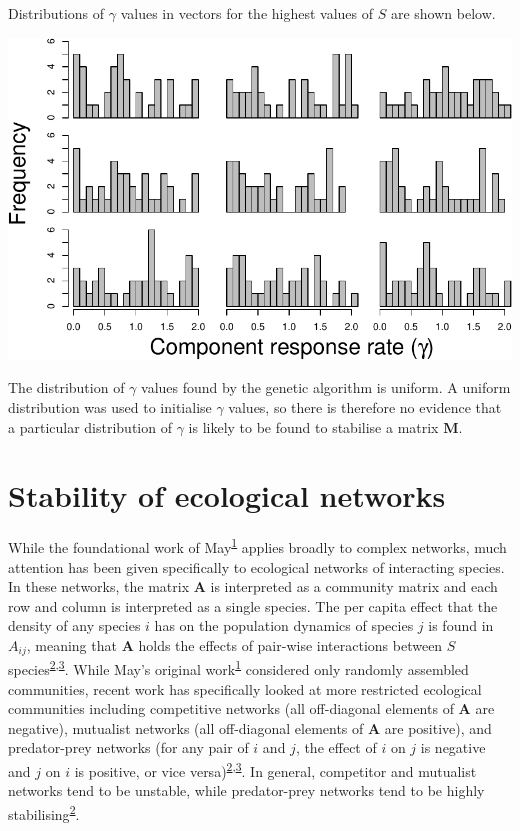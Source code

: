 \documentclass[]{article}
\begin{document}
Distributions of \(\gamma\) values in vectors for the highest values of
\(S\) are shown below.

\includegraphics{SI_files/figure-latex/unnamed-chunk-7-1.pdf}

The distribution of \(\gamma\) values found by the genetic algorithm is
uniform. A uniform distribution was used to initialise \(\gamma\)
values, so there is therefore no evidence that a particular distribution
of \(\gamma\) is likely to be found to stabilise a matrix
\(\mathbf{M}\).

\hypertarget{ecological}{\section{Stability of ecological
networks}\label{ecological}}

While the foundational work of
May\textsuperscript{\protect\hyperlink{ref-May1972}{1}} applies broadly
to complex networks, much attention has been given specifically to
ecological networks of interacting species. In these networks, the
matrix \(\mathbf{A}\) is interpreted as a community matrix and each row
and column is interpreted as a single species. The per capita effect
that the density of any species \(i\) has on the population dynamics of
species \(j\) is found in \(A_{ij}\), meaning that \(\mathbf{A}\) holds
the effects of pair-wise interactions between \(S\)
species\textsuperscript{\protect\hyperlink{ref-Allesina2012}{2},\protect\hyperlink{ref-Allesina2015}{3}}.
While May's original
work\textsuperscript{\protect\hyperlink{ref-May1972}{1}} considered only
randomly assembled communities, recent work has specifically looked at
more restricted ecological communities including competitive networks
(all off-diagonal elements of \(\mathbf{A}\) are negative), mutualist
networks (all off-diagonal elements of \(\mathbf{A}\) are positive), and
predator-prey networks (for any pair of \(i\) and \(j\), the effect of
\(i\) on \(j\) is negative and \(j\) on \(i\) is positive, or vice
versa)\textsuperscript{\protect\hyperlink{ref-Allesina2012}{2},\protect\hyperlink{ref-Allesina2015}{3}}.
In general, competitor and mutualist networks tend to be unstable, while
predator-prey networks tend to be highly
stabilising\textsuperscript{\protect\hyperlink{ref-Allesina2012}{2}}.
\end{document}
